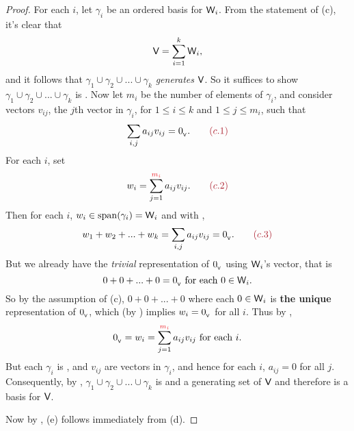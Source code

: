 \begin{proof}
For each \(i\), let \(\gamma_i\) be an ordered basis for \(\textsf{W}_i\).
From the statement of (c), it's clear that
\[
    \textsf{V} = \sum_{i = 1}^k \textsf{W}_i,
\]
and it follows that \(\gamma_1 \cup \gamma_2 \cup ... \cup \gamma_k\) \emph{generates} \(\textsf{V}\).
So it suffices to show \(\gamma_1 \cup \gamma_2 \cup ... \cup \gamma_k\) is \LID{}.
Now let \(m_i\) be the number of elements of \(\gamma_i\), and consider vectors \(v_{ij}\), the \(j\)th vector in \(\gamma_i\), for \(1 \le i \le k\) and \(1 \le j \le m_i\), such that
\[
    \sum_{i, j} a_{ij} v_{ij} = \OV. \quad \quad \MAROON{(c.1)}
\]
For each \(i\), set
\[
    w_i = \sum_{j = 1}^{\RED{m_i}} a_{ij} v_{ij}. \quad \quad \MAROON{(c.2)}
\]
Then for each \(i\), \(w_i \in \operatorname{span}(\gamma_i) = \textsf{W}_i\) and with ,
\[
    w_1 + w_2 + ... + w_k = \sum_{i, j} a_{ij} v_{ij} = \OV. \quad \quad \MAROON{(c.3)}
\]
But we already have the \emph{trivial} representation of \(0_{_{\textsf{V}}}\) using \(\textsf{W}_i\)'s vector, that is
\[
    0 + 0 + ... + 0 = 0_{_{\textsf{V}}} \text{ for each } 0 \in \textsf{W}_i.
\]
So by the assumption of (c), \(0 + 0 + ... + 0\) where each \(0 \in \textsf{W}_i\) is \textbf{the unique} representation of \(0_{_{\textsf{V}}}\), which (by ) implies \(w_i = 0_{_{\textsf{V}}}\) for all \(i\).
Thus by ,
\[
    \OV = w_i = \sum_{j = 1}^{\RED{m_i}} a_{ij} v_{ij} \text{ for each } i.
\]
But each \(\gamma_i\) is \LID{}, and \(v_{ij}\) are vectors in \(\gamma_i\), and hence for each \(i\), \(a_{ij} = 0\) for all \(j\).
Consequently, by , \(\gamma_1 \cup \gamma_2 \cup ... \cup \gamma_k\) is \LID{} and a generating set of \(\textsf{V}\) and therefore is a basis for \(\textsf{V}\).

Now by , (e) follows immediately from (d).


\end{proof}
